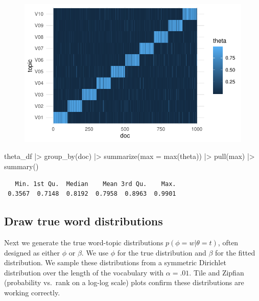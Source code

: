 \documentclass[
]{article}
\newenvironment{Shaded}{\begin{snugshade}}{\end{snugshade}}
\newcommand{\AttributeTok}[1]{\textcolor[rgb]{0.40,0.45,0.13}{#1}}
\newcommand{\FunctionTok}[1]{\textcolor[rgb]{0.28,0.35,0.67}{#1}}
\newcommand{\NormalTok}[1]{\textcolor[rgb]{0.00,0.23,0.31}{#1}}
\newcommand{\SpecialCharTok}[1]{\textcolor[rgb]{0.37,0.37,0.37}{#1}}
\begin{document}
\begin{figure}[H]

{\centering \includegraphics{paper_files/figure-pdf/unnamed-chunk-5-1.pdf}

}

\end{figure}

\begin{Shaded}
\begin{Highlighting}[]
\NormalTok{theta\_df }\SpecialCharTok{|\textgreater{}} 
    \FunctionTok{group\_by}\NormalTok{(doc) }\SpecialCharTok{|\textgreater{}} 
    \FunctionTok{summarize}\NormalTok{(}\AttributeTok{max =} \FunctionTok{max}\NormalTok{(theta)) }\SpecialCharTok{|\textgreater{}} 
    \FunctionTok{pull}\NormalTok{(max) }\SpecialCharTok{|\textgreater{}} 
    \FunctionTok{summary}\NormalTok{()}
\end{Highlighting}
\end{Shaded}

\begin{verbatim}
   Min. 1st Qu.  Median    Mean 3rd Qu.    Max. 
 0.3567  0.7148  0.8192  0.7958  0.8963  0.9901 
\end{verbatim}

\hypertarget{draw-true-word-distributions}{%
\subsection{Draw true word
distributions}\label{draw-true-word-distributions}}

Next we generate the true word-topic distributions
\(p(\phi = w | \theta = t)\), often designed as either \(\phi\) or
\(\beta\). We use \(\phi\) for the true distribution and \(\beta\) for
the fitted distribution. We sample these distributions from a symmetric
Dirichlet distribution over the length of the vocabulary with
\(\alpha = .01\). Tile and Zipfian (probability vs.~rank on a log-log
scale) plots confirm these distributions are working correctly.
\end{document}
